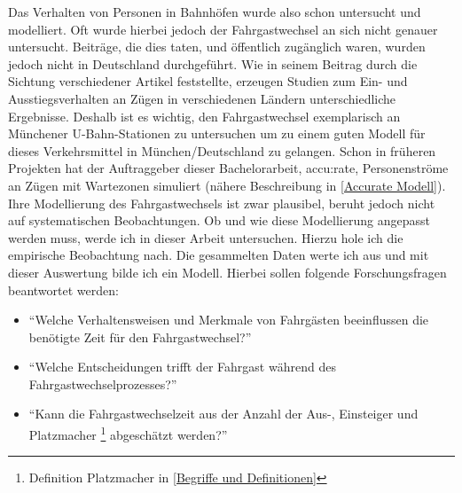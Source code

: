 Das Verhalten von Personen in Bahnhöfen wurde also schon untersucht und modelliert. Oft wurde hierbei jedoch der Fahrgastwechsel an sich nicht genauer untersucht. Beiträge, die dies taten, und öffentlich zugänglich waren, wurden jedoch nicht in Deutschland durchgeführt. Wie \cite{Zhang.2008} in seinem Beitrag durch die Sichtung verschiedener Artikel feststellte, erzeugen Studien zum Ein- und Ausstiegsverhalten an Zügen in verschiedenen Ländern unterschiedliche Ergebnisse.
Deshalb ist es wichtig, den Fahrgastwechsel exemplarisch an Münchener U-Bahn-Stationen zu untersuchen um zu einem guten Modell für dieses Verkehrsmittel in München/Deutschland zu gelangen.
Schon in früheren Projekten hat der Auftraggeber dieser Bachelorarbeit, accu:rate, Personenströme an Zügen mit Wartezonen simuliert (nähere Beschreibung in \ref{Accurate Modell}). Ihre Modellierung des Fahrgastwechsels ist zwar plausibel, beruht jedoch nicht auf systematischen Beobachtungen. Ob und wie diese Modellierung angepasst werden muss, werde ich in dieser Arbeit untersuchen. Hierzu hole ich die empirische Beobachtung nach. Die gesammelten Daten werte ich aus und mit dieser Auswertung bilde ich ein Modell. Hierbei sollen folgende Forschungsfragen beantwortet werden:
\begin{itemize}
 \item "`Welche Verhaltensweisen und Merkmale von Fahrgästen beeinflussen die benötigte Zeit für den Fahrgastwechsel?"'
 \item "`Welche Entscheidungen trifft der Fahrgast während des Fahrgastwechselprozesses?"'
 \item "`Kann die Fahrgastwechselzeit aus der Anzahl der Aus-, Einsteiger und Platzmacher \footnote{Definition Platzmacher in \ref{Begriffe und Definitionen}} abgeschätzt werden?"'
\end{itemize}

